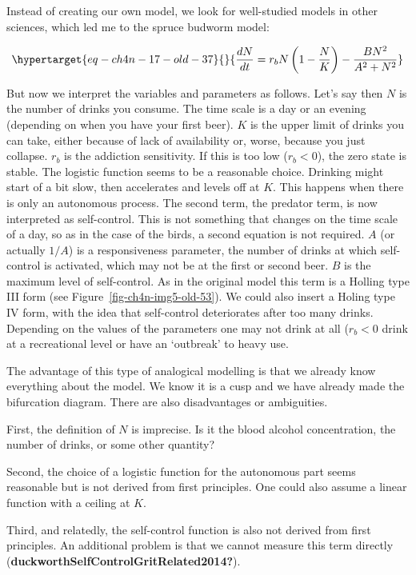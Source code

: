 \documentclass[
  a4paper,
  DIV=11,
  numbers=noendperiod,
  oneside]{scrreprt}
\begin{document}
Instead of creating our own model, we look for well-studied models in
other sciences, which led me to the spruce budworm model:

\begin{equation}\protect\hypertarget{eq-ch4n-17-old-37}{}{
\frac{dN}{dt} = r_{b}N\left( 1 - \frac{N}{K} \right) - \frac{BN^{2}}{A^{2} + N^{2}}
}\label{eq-ch4n-17-old-37}\end{equation}

But now we interpret the variables and parameters as follows. Let's say
then \(N\) is the number of drinks you consume. The time scale is a day
or an evening (depending on when you have your first beer). \(K\) is the
upper limit of drinks you can take, either because of lack of
availability or, worse, because you just collapse. \(r_{b}\) is the
addiction sensitivity. If this is too low (\(r_{b} < 0\)), the zero
state is stable. The logistic function seems to be a reasonable choice.
Drinking might start of a bit slow, then accelerates and levels off at
\(K\). This happens when there is only an autonomous process. The second
term, the predator term, is now interpreted as self-control. This is not
something that changes on the time scale of a day, so as in the case of
the birds, a second equation is not required. \(A\) (or actually
\(1/A\)) is a responsiveness parameter, the number of drinks at which
self-control is activated, which may not be at the first or second beer.
\(B\) is the maximum level of self-control. As in the original model
this term is a Holling type III form (see
Figure~\ref{fig-ch4n-img5-old-53}). We could also insert a Holing type
IV form, with the idea that self-control deteriorates after too many
drinks. Depending on the values of the parameters one may not drink at
all (\(r_{b} < 0\) drink at a recreational level or have an `outbreak'
to heavy use.

The advantage of this type of analogical modelling is that we already
know everything about the model. We know it is a cusp and we have
already made the bifurcation diagram. There are also disadvantages or
ambiguities.

First, the definition of \(N\) is imprecise. Is it the blood alcohol
concentration, the number of drinks, or some other quantity?

Second, the choice of a logistic function for the autonomous part seems
reasonable but is not derived from first principles. One could also
assume a linear function with a ceiling at \(K\).

Third, and relatedly, the self-control function is also not derived from
first principles. An additional problem is that we cannot measure this
term directly (\textbf{duckworthSelfControlGritRelated2014?}).
\end{document}

